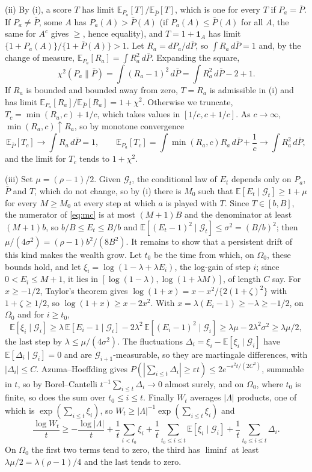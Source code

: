\documentclass[12pt]{article}
\newcommand{\E}{\mathbb{E}}
\newcommand{\G}{\mathcal{G}}
\theoremstyle{remark}
\begin{document}
(ii) By (i), a score $T$ has limit $\E_{P_a}[T]/\E_{\bar P}[T]$, which is one
for every $T$ if $P_a = \bar P$. If $P_a \ne \bar P$, some $A$ has
$P_a(A) > \bar P(A)$ (if $P_a(A) \le \bar P(A)$ for all $A$, the same for $A^c$
gives $\ge$, hence equality), and $T = 1 + \mathbf 1_A$ has limit
$\{1 + P_a(A)\}/\{1 + \bar P(A)\} > 1$. Let $R_a = dP_a/d\bar P$, so
$\int R_a\, d\bar P = 1$ and, by the change of measure,
$\E_{P_a}[R_a] = \int R_a^2\, d\bar P$. Expanding the square,
\[
\chi^2(P_a\|\bar P) = \int (R_a - 1)^2\, d\bar P = \int R_a^2\, d\bar P - 2 + 1 .
\]
If $R_a$ is bounded and bounded away from zero, $T = R_a$ is admissible in (i)
and has limit $\E_{P_a}[R_a]/\E_{\bar P}[R_a] = 1 + \chi^2$. Otherwise we
truncate, $T_c = \min(R_a, c) + 1/c$, which takes values in $[1/c, c + 1/c]$.
As $c \to \infty$,
$\min(R_a, c) \uparrow R_a$, so by monotone convergence
\[
\E_{\bar P}[T_c] \to \int R_a\, d\bar P = 1,
\qquad
\E_{P_a}[T_c] = \int \min(R_a, c) R_a\, d\bar P + \frac1c \to \int R_a^2\, d\bar P,
\]
and the limit for $T_c$ tends to $1 + \chi^2$.

(iii) Set $\mu = (\rho - 1)/2$. Given $\G_t$, the conditional law of $E_t$
depends only on $P_a$, $\bar P$ and $T$, which do not change, so by (i) there
is $M_0$ such that $\E[E_t \mid \G_t] \ge 1 + \mu$ for every $M \ge M_0$ at
every step at which $a$ is played with $T$. Since $T \in [b, B]$, the
numerator of \eqref{eq:mc} is at most $(M+1)B$ and the denominator at least
$(M+1)b$, so $b/B \le E_t \le B/b$ and
$\E[(E_t - 1)^2 \mid \G_t] \le \sigma^2 = (B/b)^2$; then
$\mu/(4\sigma^2) = (\rho-1)b^2/(8B^2)$. It remains to show that a persistent
drift of this kind makes the wealth grow. Let $t_0$ be the time from which,
on $\Omega_0$, these bounds hold, and let
$\xi_i = \log(1 - \lambda + \lambda E_i)$, the log-gain of step $i$;
since $0 < E_i \le M+1$, it lies in $[\log(1-\lambda), \log(1+\lambda M)]$, of
length $C$ say. For $x \ge -1/2$, Taylor's theorem gives
$\log(1+x) = x - x^2/\{2(1+\zeta)^2\}$ with $1+\zeta \ge 1/2$, so
$\log(1+x) \ge x - 2x^2$. With $x = \lambda(E_i - 1) \ge -\lambda \ge -1/2$, on
$\Omega_0$ and for $i \ge t_0$,
\[
\E[\xi_i \mid \G_i] \ge \lambda\,\E[E_i - 1 \mid \G_i] - 2\lambda^2\,\E[(E_i-1)^2 \mid \G_i]
\ge \lambda\mu - 2\lambda^2\sigma^2 \ge \lambda\mu/2,
\]
the last step by $\lambda \le \mu/(4\sigma^2)$. The fluctuations
$\Delta_i = \xi_i - \E[\xi_i \mid \G_i]$ have $\E[\Delta_i \mid \G_i] = 0$ and are
$\G_{i+1}$-measurable, so they are martingale differences, with
$|\Delta_i| \le C$. Azuma--Hoeffding \citep{azuma1967weighted} gives
$P(|\sum_{i \le t}\Delta_i| \ge \varepsilon t) \le 2e^{-\varepsilon^2 t/(2C^2)}$,
summable in $t$, so by Borel--Cantelli $t^{-1}\sum_{i \le t}\Delta_i \to 0$
almost surely, and on $\Omega_0$, where $t_0$ is finite, so does the sum over
$t_0 \le i \le t$. Finally $W_t$ averages $|\Lambda|$ products, one of which is
$\exp(\sum_{i \le t}\xi_i)$, so $W_t \ge |\Lambda|^{-1}\exp(\sum_{i \le t}\xi_i)$ and
\[
\frac{\log W_t}{t} \ge -\frac{\log|\Lambda|}{t} + \frac1t\sum_{i < t_0} \xi_i
+ \frac1t\sum_{t_0 \le i \le t} \E[\xi_i \mid \G_i] + \frac1t\sum_{t_0 \le i \le t}\Delta_i .
\]
On $\Omega_0$ the first two terms tend to zero, the third has $\liminf$ at
least $\lambda\mu/2 = \lambda(\rho-1)/4$ and the last tends to zero.
\end{document}
